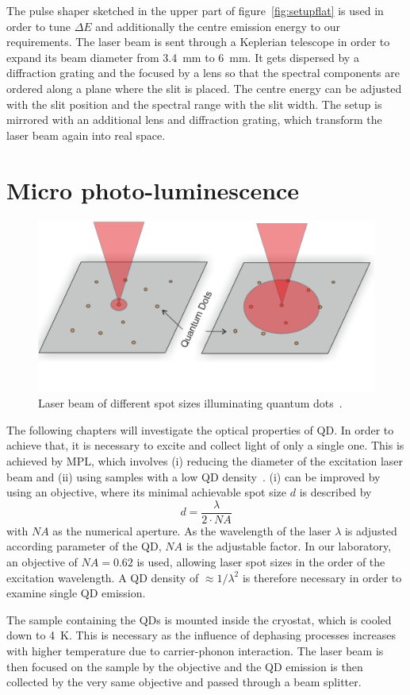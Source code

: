 The pulse shaper sketched in the upper part of figure~\ref{fig:setupflat} is used in order to tune $\Delta E$ and additionally the centre emission energy to our requirements.
The laser beam is sent through a Keplerian telescope in order to expand its beam diameter from \SI{3.4}{\milli \meter} to \SI{6}{\milli \meter}.
It gets dispersed by a diffraction grating and the focused by a lens so that the spectral components are ordered along a plane where the slit is placed.
The centre energy can be adjusted with the slit position and the spectral range with the slit width.
The setup is mirrored with an additional lens and diffraction grating, which transform the laser beam again into real space. 


\section{Micro photo-luminescence}
\begin{figure}[H]
	\centering
	\includegraphics[width=0.7\linewidth]{figures/setup/micro-pl}
	\caption{Laser beam of different spot sizes illuminating quantum dots~\cite{reindl_characterisation_2014}.}
	\label{fig:micro-pl}
\end{figure}
The following chapters will investigate the optical properties of \ac{QD}.
In order to achieve that, it is necessary to excite and collect light of only a single one.
This is achieved by \ac{MPL}, which involves (i) reducing the diameter of the excitation laser beam and (ii) using samples with a low \ac{QD} density~\cite{reindl_characterisation_2014}.
(i) can be improved by using an objective, where its minimal achievable spot size $d$ is described by
\begin{equation}
d = \frac{\lambda}{2 \cdot NA}
\end{equation}
with $NA$ as the numerical aperture.
As the wavelength of the laser $\lambda$ is adjusted according parameter of the \ac{QD}, $NA$ is the adjustable factor.
In our laboratory, an objective of $NA=0.62$ is used, allowing laser spot sizes in the order of the excitation wavelength.
A \ac{QD} density of $\approx 1 / \lambda^2$ is therefore necessary in order to examine single \ac{QD} emission.

The sample containing the \acp{QD} is mounted inside the cryostat, which is cooled down to \SI{4}{\kelvin}.
This is necessary as the influence of dephasing processes increases with higher temperature due to carrier-phonon interaction.
The laser beam is then focused on the sample by the objective and the \ac{QD} emission is then collected by the very same objective and passed through a beam splitter.